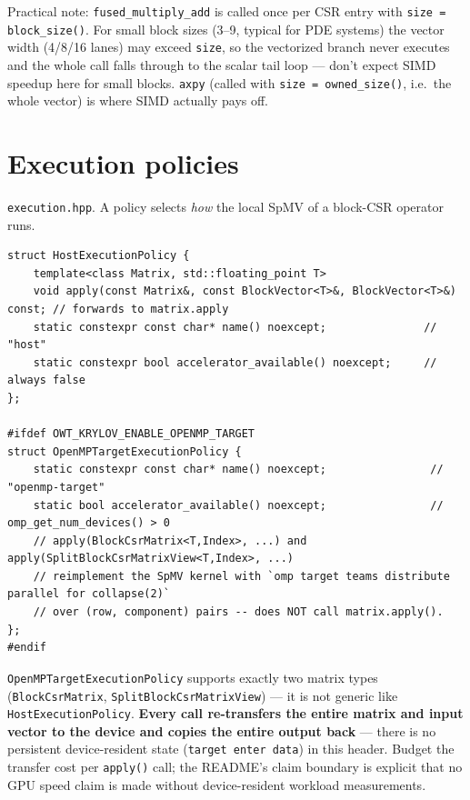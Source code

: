 \documentclass[11pt,a4paper]{report}
\begin{document}
Practical note: \lstinline!fused_multiply_add! is called once per CSR entry
with \lstinline!size = block_size()!. For small block sizes (3--9, typical for
PDE systems) the vector width (4/8/16 lanes) may exceed \lstinline!size!, so
the vectorized branch never executes and the whole call falls through to
the scalar tail loop --- don't expect SIMD speedup here for small blocks.
\lstinline!axpy! (called with \lstinline!size = owned_size()!, i.e.\ the whole
vector) is where SIMD actually pays off.

\section{Execution policies}
\label{sec:4.2}

\texttt{execution.hpp}. A policy selects \emph{how} the local SpMV of a
block-CSR operator runs.

\begin{lstlisting}
struct HostExecutionPolicy {
    template<class Matrix, std::floating_point T>
    void apply(const Matrix&, const BlockVector<T>&, BlockVector<T>&) const; // forwards to matrix.apply
    static constexpr const char* name() noexcept;               // "host"
    static constexpr bool accelerator_available() noexcept;     // always false
};

#ifdef OWT_KRYLOV_ENABLE_OPENMP_TARGET
struct OpenMPTargetExecutionPolicy {
    static constexpr const char* name() noexcept;                // "openmp-target"
    static bool accelerator_available() noexcept;                // omp_get_num_devices() > 0
    // apply(BlockCsrMatrix<T,Index>, ...) and apply(SplitBlockCsrMatrixView<T,Index>, ...)
    // reimplement the SpMV kernel with `omp target teams distribute parallel for collapse(2)`
    // over (row, component) pairs -- does NOT call matrix.apply().
};
#endif
\end{lstlisting}

\lstinline!OpenMPTargetExecutionPolicy! supports exactly two matrix types
(\lstinline!BlockCsrMatrix!, \lstinline!SplitBlockCsrMatrixView!) --- it is not
generic like \lstinline!HostExecutionPolicy!. \textbf{Every call re-transfers
the entire matrix and input vector to the device and copies the entire
output back} --- there is no persistent device-resident state
(\lstinline!target enter data!) in this header. Budget the transfer cost per
\lstinline!apply()! call; the README's claim boundary is explicit that no GPU
speed claim is made without device-resident workload measurements.
\end{document}
